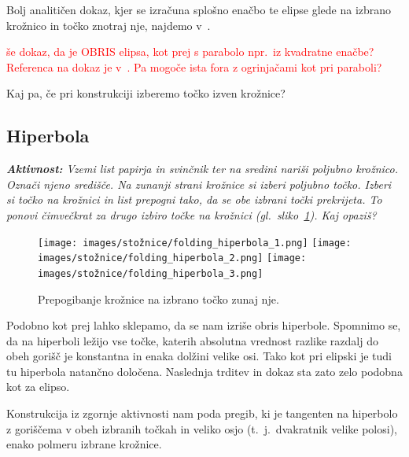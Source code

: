 Bolj analitičen dokaz, kjer se izračuna splošno enačbo te elipse glede na izbrano krožnico in točko znotraj nje, najdemo v~\cite[str.\ 204--205]{smith2003}.

\textcolor{red}{še dokaz, da je OBRIS elipsa, kot prej s parabolo npr.\ iz kvadratne enačbe? Referenca na dokaz je v~\cite[str.\ 60]{hull2013}. Pa mogoče ista fora z ogrinjačami kot pri paraboli?}

Kaj pa, če pri konstrukciji izberemo točko izven krožnice?

\subsection{Hiperbola}

\textit{\textbf{Aktivnost:} Vzemi list papirja in svinčnik ter na sredini nariši poljubno krožnico. Označi njeno središče. Na zunanji strani krožnice si izberi poljubno točko. Izberi si točko na krožnici in list prepogni tako, da se obe izbrani točki prekrijeta. To ponovi čimvečkrat za drugo izbiro točke na krožnici (gl.\ sliko~\ref{fig:koraki_hiperbola}). Kaj opaziš?}

\begin{figure}[h]
    \centering
    \texttt{[image: images/stožnice/folding\_hiperbola\_1.png]}
    \texttt{[image: images/stožnice/folding\_hiperbola\_2.png]}
    \texttt{[image: images/stožnice/folding\_hiperbola\_3.png]}
    \caption[Prepogibanje hiperbole]{Prepogibanje krožnice na izbrano točko zunaj nje.}
    \label{fig:koraki_hiperbola}
\end{figure}

Podobno kot prej lahko sklepamo, da se nam izriše obris hiperbole. Spomnimo se, da na hiperboli ležijo vse točke, katerih absolutna vrednost razlike razdalj do obeh gorišč je konstantna in enaka dolžini velike osi. Tako kot pri elipski je tudi tu hiperbola natančno določena. Naslednja trditev in dokaz sta zato zelo podobna kot za elipso.

\begin{trditev}
    Konstrukcija iz zgornje aktivnosti nam poda pregib, ki je tangenten na hiperbolo z goriščema v obeh izbranih točkah in veliko osjo (t.\ j.\ dvakratnik velike polosi), enako polmeru izbrane krožnice.
\end{trditev}

